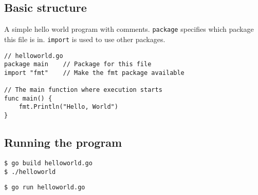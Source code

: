 \subsection{Basic structure}
A simple hello world program with comments.
\texttt{package} specifies which package this file is in.
\texttt{import} is used to use other packages.

\begin{lstlisting}
// helloworld.go
package main    // Package for this file
import "fmt"    // Make the fmt package available

// The main function where execution starts
func main() { 
  	fmt.Println("Hello, World") 
}
\end{lstlisting}
\subsection{Running the program}
\begin{lstlisting}
$ go build helloworld.go
$ ./helloworld
\end{lstlisting}

\begin{lstlisting}
$ go run helloworld.go
\end{lstlisting}
